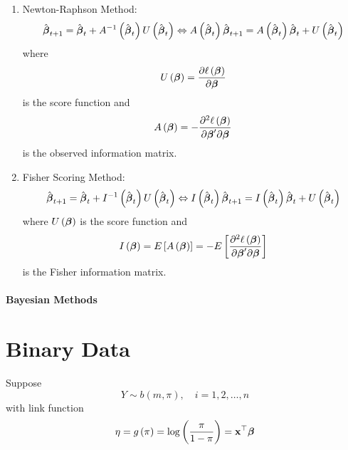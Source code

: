 \begin{enumerate}
	\item Newton-Raphson Method:
	      \begin{equation}
		      \hat{\boldsymbol{\beta}}_{t+1}=\hat{\boldsymbol{\beta}}_{t}+A^{-1}\left(\hat{\boldsymbol{\beta}}_{t}\right)U\left(\hat{\boldsymbol{\beta}}_{t}\right)\Leftrightarrow A\left(\hat{\boldsymbol{\beta}}_{t}\right)\hat{\boldsymbol{\beta}}_{t+1}=A\left(\hat{\boldsymbol{\beta}}_{t}\right)\hat{\boldsymbol{\beta}}_{t}+U\left(\hat{\boldsymbol{\beta}}_{t}\right)
	      \end{equation}
	      where
	      \begin{equation}
		      U\left(\boldsymbol{\beta}\right)=\frac{\partial\ell\left(\boldsymbol{\beta}\right)}{\partial\boldsymbol{\beta}}
	      \end{equation}
	      is the score function and
	      \begin{equation}
		      A\left(\boldsymbol{\beta}\right)=-\frac{\partial^{2}\ell\left(\boldsymbol{\beta}\right)}{\partial\boldsymbol{\beta}^{\prime}\partial\boldsymbol{\beta}}
	      \end{equation}
	      is the observed information matrix.
	\item Fisher Scoring Method:
	      \begin{equation}
		      \hat{\boldsymbol{\beta}}_{t+1}=\hat{\boldsymbol{\beta}}_{t}+I^{-1}\left(\hat{\boldsymbol{\beta}}_{t}\right)U\left(\hat{\boldsymbol{\beta}}_{t}\right)\Leftrightarrow I\left(\hat{\boldsymbol{\beta}}_{t}\right)\hat{\boldsymbol{\beta}}_{t+1}=I\left(\hat{\boldsymbol{\beta}}_{t}\right)\hat{\boldsymbol{\beta}}_{t}+U\left(\hat{\boldsymbol{\beta}}_{t}\right)
	      \end{equation}
	      where \(U\left(\boldsymbol{\beta}\right)\) is the score function and
	      \begin{equation}
		      I\left(\boldsymbol{\beta}\right)=E\left[A\left(\boldsymbol{\beta}\right)\right]=-E\left[\frac{\partial^{2}\ell\left(\boldsymbol{\beta}\right)}{\partial\boldsymbol{\beta}^{\prime}\partial\boldsymbol{\beta}}\right]
	      \end{equation}
	      is the Fisher information matrix.
\end{enumerate}

\paragraph{Bayesian Methods}

\section{Binary Data}

Suppose
\begin{equation}
	Y\sim b\left(m,\pi\right),\quad i=1,2,\ldots,n
\end{equation}
with link function
\begin{equation}
	\eta=g\left(\pi\right)=\log\left(\frac{\pi}{1-\pi}\right)=\mathbf{x}^{\top}\boldsymbol{\beta}
\end{equation}
\begin{remark}

\end{remark}

